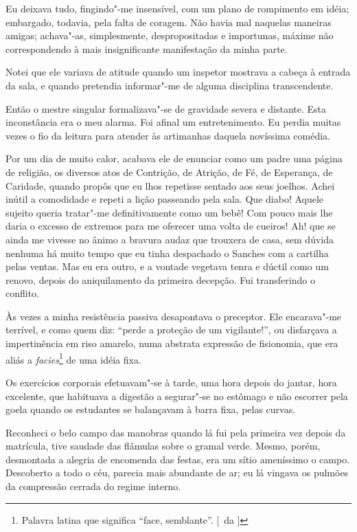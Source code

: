 Eu deixava tudo, fingindo"-me insensível, com um plano de rompimento em idéia;
embargado, todavia, pela falta de coragem. Não havia mal naquelas
maneiras amigas; achava"-as, simplesmente, despropositadas e
importunas, máxime não correspondendo à mais insignificante
manifestação da minha parte. 

Notei que ele variava de atitude quando um
inspetor mostrava a cabeça à entrada da sala, e quando pretendia
informar"-me de alguma disciplina transcendente. 

Então o mestre singular formalizava"-se de gravidade severa e distante. 
Esta inconstância era o meu alarma. Foi afinal um entretenimento. Eu perdia
muitas vezes o fio da leitura para atender às artimanhas daquela
novíssima comédia. 

Por um dia de muito calor, acabava ele de enunciar
como um padre uma página de religião, os diversos atos de Contrição, de
Atrição, de Fé, de Esperança, de Caridade, quando propôs que eu lhos
repetisse sentado aos seus joelhos. Achei inútil a comodidade e repeti
a lição passeando pela sala. Que diabo! Aquele sujeito queria
tratar"-me definitivamente como um bebê! Com pouco mais lhe daria o
excesso de extremos para me oferecer uma volta de cueiros! Ah! que se
ainda me vivesse no ânimo a bravura audaz que trouxera de casa, sem
dúvida nenhuma há muito tempo que eu tinha despachado o Sanches com a
cartilha pelas ventas. Mas eu era outro, e a vontade vegetava tenra e
dúctil como um renovo, depois do aniquilamento da primeira decepção.
Fui transferindo o conflito. 

Às vezes a minha resistência passiva
desapontava o preceptor. Ele encarava"-me terrível, e como quem diz:
``perde a proteção de um vigilante!'', ou disfarçava a impertinência em
riso amarelo, numa abstrata expressão de fisionomia, que era aliás a 
\textit{facies}\footnote{ Palavra latina que significa ``face, semblante''.  
[~da ]} de uma idéia fixa. 

Os exercícios corporais efetuavam"-se à tarde, uma hora depois
do jantar, hora excelente, que habituava a digestão a segurar"-se no
estômago e não escorrer pela goela quando os estudantes se balançavam à
barra fixa, pelas curvas. 

Reconheci o belo campo das manobras quando lá
fui pela primeira vez depois da matrícula, tive saudade das flâmulas
sobre o gramal verde. Mesmo, porém, desmontada a alegria de encomenda
das festas, era um sítio ameníssimo o campo. Descoberto a todo o céu,
parecia mais abundante de ar; eu lá vingava os pulmões da compressão
cerrada do regime interno. 

